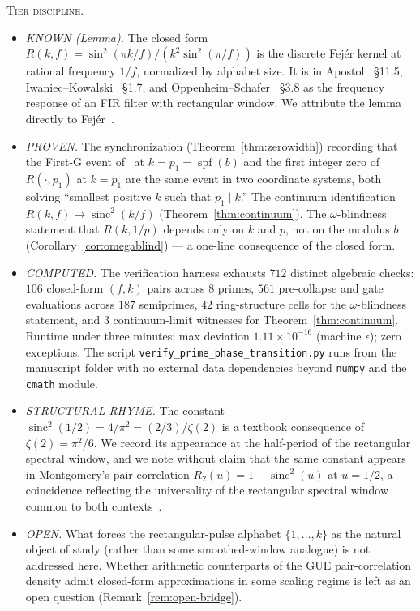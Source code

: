 \documentclass[11pt,reqno]{amsart}
\theoremstyle{plain}
\theoremstyle{definition}
\theoremstyle{remark}
\DeclareMathOperator{\spf}{spf}
\DeclareMathOperator{\sinc}{sinc}
\begin{document}
\medskip\noindent
\textsc{Tier discipline.}
\begin{itemize}\setlength\itemsep{2pt}
\item \emph{KNOWN (Lemma).} The closed form
$R(k, f) = \sin^2(\pi k / f) / (k^2 \sin^2(\pi / f))$ is the
discrete Fej\'er kernel at rational frequency $1/f$, normalized
by alphabet size. It is in Apostol~\cite{Apostol1976} \S11.5,
Iwaniec--Kowalski~\cite{IwaniecKowalski2004} \S1.7, and
Oppenheim--Schafer~\cite{OppenheimSchafer2010} \S3.8 as the
frequency response of an FIR filter with rectangular window.
We attribute the lemma directly to Fej\'er~\cite{Fejer1900}.
\item \emph{PROVEN.} The synchronization (Theorem~\ref{thm:zerowidth})
recording that the First-G event of~\cite{J04Sanders} at
$k = p_1 = \spf(b)$ and the first integer zero of
$R(\cdot, p_1)$ at $k = p_1$ are the same event in two
coordinate systems, both solving ``smallest positive $k$ such
that $p_1 \mid k$.'' The continuum identification
$R(k, f) \to \sinc^2(k/f)$
(Theorem~\ref{thm:continuum}). The $\omega$-blindness statement
that $R(k, 1/p)$ depends only on $k$ and $p$, not on the
modulus $b$ (Corollary~\ref{cor:omegablind}) --- a one-line
consequence of the closed form.
\item \emph{COMPUTED.} The verification harness exhausts
$712$ distinct algebraic checks: $106$ closed-form $(f, k)$
pairs across $8$ primes, $561$ pre-collapse and gate evaluations
across $187$ semiprimes, $42$ ring-structure cells for the
$\omega$-blindness statement, and $3$ continuum-limit witnesses
for Theorem~\ref{thm:continuum}. Runtime under three minutes;
max deviation $1.11 \times 10^{-16}$ (machine $\epsilon$); zero
exceptions. The script
\texttt{verify\_prime\_phase\_transition.py} runs from the
manuscript folder with no external data dependencies beyond
\texttt{numpy} and the \texttt{cmath} module.
\item \emph{STRUCTURAL RHYME.} The constant $\sinc^2(1/2) =
4/\pi^2 = (2/3)/\zeta(2)$ is a textbook consequence of
$\zeta(2) = \pi^2/6$. We record its appearance at the
half-period of the rectangular spectral window, and we note
without claim that the same constant appears in Montgomery's
pair correlation $R_2(u) = 1 - \sinc^2(u)$ at $u = 1/2$, a
coincidence reflecting the universality of the rectangular
spectral window common to both contexts~\cite{Montgomery1973,
OppenheimSchafer2010}.
\item \emph{OPEN.} What forces the rectangular-pulse alphabet
$\{1, \ldots, k\}$ as the natural object of study (rather than
some smoothed-window analogue) is not addressed here. Whether
arithmetic counterparts of the GUE pair-correlation density
admit closed-form approximations in some scaling regime is
left as an open question (Remark~\ref{rem:open-bridge}).
\end{itemize}
\end{document}
